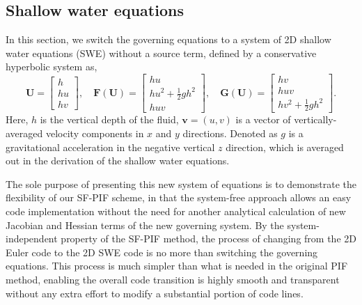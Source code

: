 \documentclass[times,preprint,3p]{elsarticle}
\newcommand{\bF}{\mathbf{F}}
\newcommand{\bG}{\mathbf{G}}
\newcommand{\bU}{\mathbf{U}}
\begin{document}
\subsection{Shallow water equations}\label{subsec:2d-shallow}
%
In this section, we switch the governing equations to a system of
2D shallow water equations (SWE) without a source term, defined
by a conservative hyperbolic system as,
%
\begin{equation}\label{eq:2d-shallow}
    \bU = \begin{bmatrix}
        h \\
        h u \\
        h v
    \end{bmatrix},\quad
    \bF (\bU) = \begin{bmatrix}
        h u \\
        h u^{2} + \frac{1}{2} g h^{2} \\
        h u v
    \end{bmatrix}, \quad
    \bG (\bU) = \begin{bmatrix}
        h v \\
        h u v \\
        h v^{2} + \frac{1}{2} g h^{2}
    \end{bmatrix}.
\end{equation}
Here, \( h \) is the vertical depth of the fluid,
\( \mathbf{v} = \left( u, v \right)  \) is a vector of
vertically-averaged velocity components in $x$ and $y$ directions.
Denoted as \( g \) is a gravitational acceleration in the negative vertical
$z$ direction, which is averaged out in the derivation of the shallow water equations.

The sole purpose of presenting this new system of equations is to
demonstrate the flexibility
of our SF-PIF scheme, in that the system-free approach
allows an easy code implementation
without the need for another analytical calculation of
new Jacobian and Hessian terms of the new governing system.
%
By the system-independent property of the SF-PIF method,
the process of changing from the 2D Euler code to
the 2D SWE code is no more than
switching  the governing equations.
This process is much simpler than
what is needed in the original PIF method,
enabling the overall code transition is highly smooth and transparent
without any extra effort to modify a substantial portion of code lines.
\end{document}
